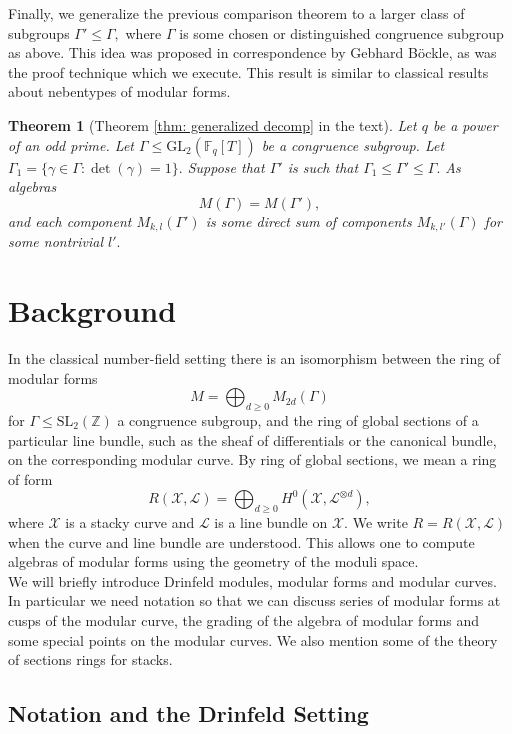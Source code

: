 \documentclass[11pt]{amsart}
\newtheorem{theorem}{Theorem}[section]
\theoremstyle{definition}
\numberwithin{equation}{section}
\newcommand{\GL}{\mathrm{GL}} 	%
\newcommand{\SL}{\mathrm{SL}} 	%
\newcommand{\sL}{\mathscr{L}}		%
\newcommand{\sX}{\mathscr{X}}		%
\newcommand{\bbF}{\mathbb{F}}		%
\newcommand{\bbZ}{\mathbb{Z}}		%
\begin{document}
		Finally, we generalize the previous comparison theorem to a larger class of subgroups $\Gamma'\leq \Gamma,$ where $\Gamma$ is some chosen or distinguished congruence subgroup as above. This idea was proposed in correspondence by Gebhard B\"ockle, as was the proof technique which we execute. This result is similar to classical results about nebentypes of modular forms. 
		\begin{theorem}[Theorem \ref{thm: generalized decomp} in the text]
			Let $q$ be a power of an odd prime. Let $\Gamma\leq \GL_2(\bbF_q[T])$ be a congruence subgroup. Let $\Gamma_1=\{\gamma\in \Gamma: \det(\gamma)=1\}.$ Suppose that $\Gamma'$ is such that $\Gamma_1\leq \Gamma'\leq \Gamma.$ As algebras
			\[M(\Gamma)=M(\Gamma'),\] and each component $M_{k,l}(\Gamma')$ is some direct sum of components $M_{k,l'}(\Gamma)$ for some nontrivial $l'.$
		\end{theorem}
		
		\section{Background} %
		
		In the classical number-field setting there is an isomorphism between the ring of modular forms 
		\[M = \bigoplus_{d\geq 0} M_{2d}(\Gamma)\]
		for $\Gamma\leq \SL_2(\bbZ)$ a congruence subgroup, and the ring of global sections of a particular line bundle, such as the sheaf of differentials or the canonical bundle, on the corresponding modular curve. By ring of global sections, we mean a ring of form 
		\[R(\sX,\sL)=\bigoplus_{d\geq 0}H^0(\sX,\sL^{\otimes d}),\]
		where $\sX$ is a stacky curve and $\sL$ is a line bundle on $\sX.$ We write $R=R(\sX,\sL)$ when the curve and line bundle are understood.
		This allows one to compute algebras of modular forms using the geometry of the moduli space.\\
		
		We will briefly introduce Drinfeld modules, modular forms and modular  curves. In particular we need notation so that we can discuss series of modular forms at cusps of the modular curve, the grading of the algebra of modular forms and some special points on the modular curves. We also mention some of the theory of sections rings for stacks.  
		
		\subsection{Notation and the Drinfeld Setting}
		
\end{document}
